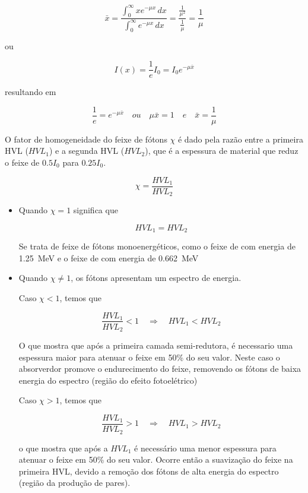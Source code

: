 \documentclass[11pt,a4paper]{article}
\begin{document}
            \begin{equation}
                \bar{x} = \frac{\int_{0}^{\infty} x e^{- \mu x} \,dx }{\int_{0}^{\infty} e^{- \mu x} \,dx } = 
                \frac{\frac{1}{\mu^2}}{\frac{1}{\mu}} = \frac{1}{\mu}
            \end{equation}

    \noindent ou

                \begin{equation}
                    I(x) = \frac{1}{e}I_0 = I_0 e^{-\mu \bar{x}}
                \end{equation}

    \noindent resultando em

                \begin{equation}
                    \frac{1}{e} = e^{-\mu \bar{x}} \quad ou \quad \mu \bar{x} = 1 \quad e \quad \bar{x} = \frac{1}{\mu}
                \end{equation}

    O fator de homogeneidade do feixe de fótons $\chi $ é dado pela razão entre a primeira HVL ($HVL_1$) e a segunda HVL ($HVL_2$),  que é a espessura de material que reduz o feixe de $0.5I_0$ para $0.25I_0$.

    \begin{equation}
        \chi = \frac{HVL_1}{HVL_2}
    \end{equation}

	\begin{itemize}
		\item Quando $\chi = 1$ significa que  
		
			$$HVL_1 = HVL_2$$ 
		
		\noindent Se trata de feixe de fótons monoenergéticos, como o feixe de  com energia de \qty{1.25}{MeV} e o feixe de  com energia de \qty{0.662}{MeV}
		
		\item Quando $\chi \neq  1$, os fótons apresentam um espectro de energia. 
		
		Caso $\chi <  1$, temos que

			$$\frac{HVL_1}{HVL_2} < 1 \quad \Rightarrow \quad HVL_1 < HVL_2$$
			

		\noindent O que mostra que após a primeira camada semi-redutora, é necessario uma espessura maior para atenuar o feixe em 50\% do seu valor. Neste caso o absorverdor promove o endurecimento do feixe, removendo os fótons de baixa energia do espectro (região do efeito fotoelétrico) 

		Caso $\chi >  1$, temos que

			$$\frac{HVL_1}{HVL_2} > 1 \quad \Rightarrow \quad HVL_1 > HVL_2 $$
			

		\noindent o que mostra que após a $HVL_1$ é necessário uma menor espessura para atenuar o feixe em 50\% do seu valor. Ocorre então a suavização do feixe na primeira HVL, devido a remoção dos fótons de alta energia do espectro (região da produção de pares).

	\end{itemize}
\end{document}
